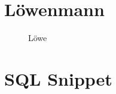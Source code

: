 %	
%

\section{Löwenmann} \label{a.1.pic}
\begin{figure}[h]
	\centering
	\caption{Löwe}
	\label{Löwe}
\end{figure}

\newpage

\section{SQL Snippet} \label{a.1.snippet.SQL} 
	
